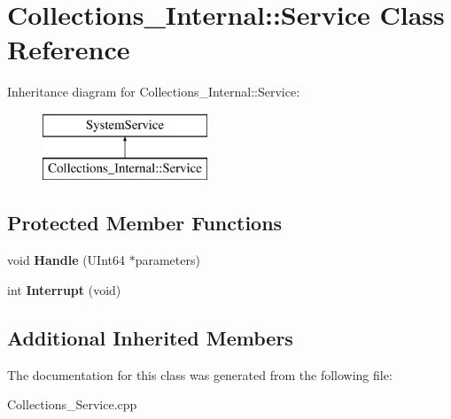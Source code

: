 \hypertarget{class_collections___internal_1_1_service}{}\section{Collections\+\_\+\+Internal\+:\+:Service Class Reference}
\label{class_collections___internal_1_1_service}
Inheritance diagram for Collections\+\_\+\+Internal\+:\+:Service\+:\begin{figure}[H]
\begin{center}
\leavevmode
\includegraphics[height=2.000000cm]{class_collections___internal_1_1_service}
\end{center}
\end{figure}
\subsection*{Protected Member Functions}
\begin{DoxyCompactItemize}
\item 
\mbox{\label{class_collections___internal_1_1_service_a2863c7cd6d093f1c908eacdc77af072e}} 
void {\bfseries Handle} (U\+Int64 $\ast$parameters)
\item 
\mbox{\label{class_collections___internal_1_1_service_ae972a295c578a0aadf3090785cdfdfb4}} 
int {\bfseries Interrupt} (void)
\end{DoxyCompactItemize}
\subsection*{Additional Inherited Members}


The documentation for this class was generated from the following file\+:\begin{DoxyCompactItemize}
\item 
Collections\+\_\+\+Service.\+cpp\end{DoxyCompactItemize}
